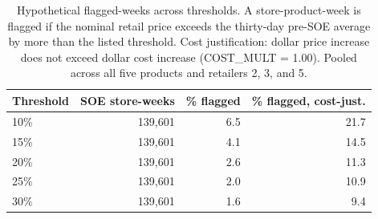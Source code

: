 \begin{table}[!h]
\centering
\caption{\label{tab:flagged_weeks_all}Hypothetical flagged-weeks across thresholds. A store-product-week is flagged if the nominal retail price exceeds the thirty-day pre-SOE average by more than the listed threshold. Cost justification: dollar price increase does not exceed dollar cost increase (COST\_MULT = 1.00). Pooled across all five products and retailers 2, 3, and 5.}
\centering
\begin{tabular}[t]{lrrr}
\toprule
Threshold & SOE store-weeks & \% flagged & \% flagged, cost-just.\\
\midrule
10\% & 139,601 & 6.5 & 21.7\\
15\% & 139,601 & 4.1 & 14.5\\
20\% & 139,601 & 2.6 & 11.3\\
25\% & 139,601 & 2.0 & 10.9\\
30\% & 139,601 & 1.6 & 9.4\\
\bottomrule
\end{tabular}
\end{table}
